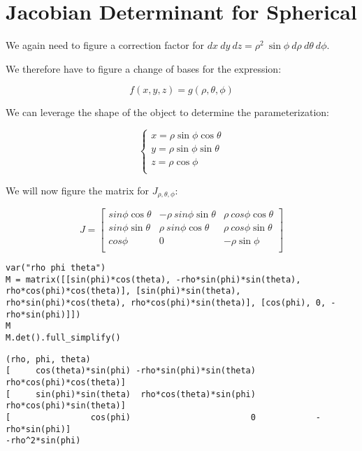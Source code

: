\documentclass[letterpaper]{article}
\begin{document}
\section{Jacobian Determinant for Spherical}
\label{sec:orgdd1c57f}
We again need to figure a correction factor for \(dx\ dy\ dz = \rho^2\ \sin\phi\ d\rho\ d\theta\ d\phi\).

We therefore have to figure a change of bases for the expression:

\begin{equation}
   f(x,y,z) = g(\rho, \theta, \phi) 
\end{equation}

We can leverage the shape of the object to determine the parameterization:

\begin{equation}
   \begin{cases}
   x = \rho\sin\phi\cos\theta \\
   y = \rho\sin\phi\sin\theta \\
   z = \rho\cos\phi \\
\end{cases}
\end{equation}

We will now figure the matrix for \(J_{\rho, \theta, \phi}\):

\begin{equation}
   J = \begin{bmatrix} 
sin\phi\cos\theta & -\rho\ sin\phi\sin\theta & \rho\ cos\phi\cos\theta \\
sin\phi\sin\theta & \rho\ sin\phi\cos\theta & \rho\ cos\phi\sin\theta \\
cos\phi & 0 & -\rho \sin \phi\\
\end{bmatrix} 
\end{equation}

\begin{verbatim}
var("rho phi theta")
M = matrix([[sin(phi)*cos(theta), -rho*sin(phi)*sin(theta), rho*cos(phi)*cos(theta)], [sin(phi)*sin(theta), rho*sin(phi)*cos(theta), rho*cos(phi)*sin(theta)], [cos(phi), 0, -rho*sin(phi)]])
M
M.det().full_simplify()
\end{verbatim}

\begin{verbatim}
(rho, phi, theta)
[     cos(theta)*sin(phi) -rho*sin(phi)*sin(theta)  rho*cos(phi)*cos(theta)]
[     sin(phi)*sin(theta)  rho*cos(theta)*sin(phi)  rho*cos(phi)*sin(theta)]
[                cos(phi)                        0            -rho*sin(phi)]
-rho^2*sin(phi)
\end{verbatim}
\end{document}
